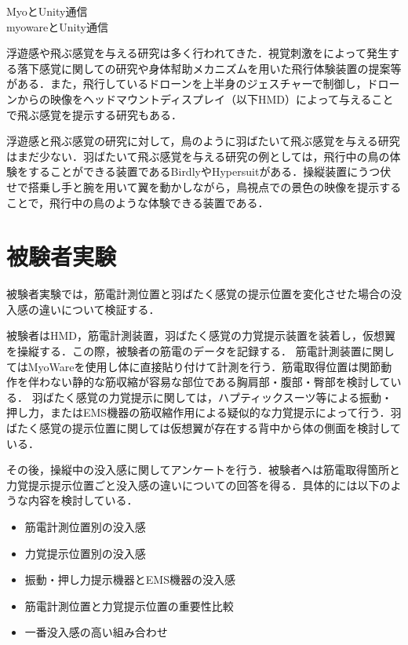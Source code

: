 
        MyoとUnity通信\\    
        myowareとUnity通信\\



        浮遊感や飛ぶ感覚を与える研究は多く行われてきた．視覚刺激をによって発生する落下感覚に関しての研究\cite{奥川夏輝2017VR空間における視覚刺激によって発生する落下感覚の分析}や身体幇助メカニズムを用いた飛行体験装置の提案\cite{鈴木拓馬2014hmd}等がある．また，飛行しているドローンを上半身のジェスチャーで制御し，ドローンからの映像をヘッドマウントディスプレイ（以下HMD）によって与えることで飛ぶ感覚を提示する研究\cite{rognon2018flyjacket}もある．

        浮遊感と飛ぶ感覚の研究に対して，鳥のように羽ばたいて飛ぶ感覚を与える研究はまだ少ない．羽ばたいて飛ぶ感覚を与える研究の例としては，飛行中の鳥の体験をすることができる装置であるBirdly\cite{rheiner2014birdly}やHypersuit\cite{hypersuit}がある．操縦装置にうつ伏せで搭乗し手と腕を用いて翼を動かしながら，鳥視点での景色の映像を提示することで，飛行中の鳥のような体験できる装置である．


        \section{被験者実験}
        
        被験者実験では，筋電計測位置と羽ばたく感覚の提示位置を変化させた場合の没入感の違いについて検証する．
        
        被験者はHMD，筋電計測装置，羽ばたく感覚の力覚提示装置を装着し，仮想翼を操縦する．この際，被験者の筋電のデータを記録する．
        筋電計測装置に関してはMyoWareを使用し体に直接貼り付けて計測を行う．筋電取得位置は関節動作を伴わない静的な筋収縮が容易な部位である胸肩部・腹部・臀部を検討している．
        羽ばたく感覚の力覚提示に関しては，ハプティックスーツ等による振動・押し力，またはEMS機器の筋収縮作用による疑似的な力覚提示によって行う．羽ばたく感覚の提示位置に関しては仮想翼が存在する背中から体の側面を検討している．
        
        その後，操縦中の没入感に関してアンケートを行う．被験者へは筋電取得箇所と力覚提示提示位置ごと没入感の違いについての回答を得る．具体的には以下のような内容を検討している．
        \begin{itemize}
        \item 筋電計測位置別の没入感
        \item 力覚提示位置別の没入感
        \item 振動・押し力提示機器とEMS機器の没入感
        \item 筋電計測位置と力覚提示位置の重要性比較
        \item 一番没入感の高い組み合わせ
        \end{itemize}
    
